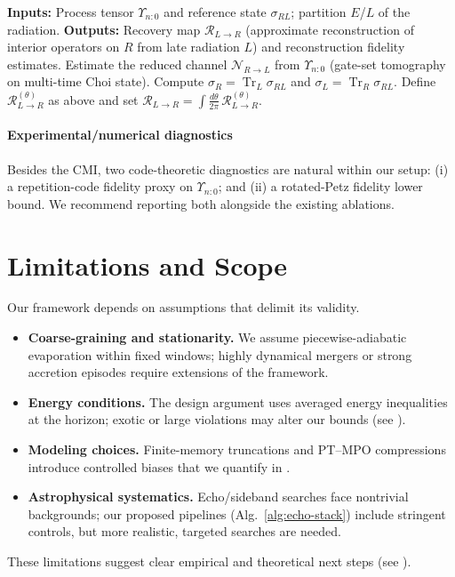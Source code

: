 \documentclass[a4paper,11pt]{article}
\newcommand{\HMC}{\textup{\textsc{HMC}}\xspace}
\newcommand{\Tr}{\operatorname{Tr}}
\theoremstyle{plain}
\theoremstyle{definition}
\theoremstyle{remark}
\begin{document}
\begin{algorithm}[tbp]
\caption{QEC reconstruction for \HMC{} via rotated Petz.}
\label{alg:rotated_petz_hmc}
\begin{algorithmic}[1]
\State \textbf{Inputs:} Process tensor $\Upsilon_{n{:}0}$ and reference state $\sigma_{RL}$; partition $E$/$L$ of the radiation.
\State \textbf{Outputs:} Recovery map $\mathcal{R}_{L\to R}$ (approximate reconstruction of interior operators on $R$ from late radiation $L$) and reconstruction fidelity estimates.
\State Estimate the reduced channel $\mathcal{N}_{R\to L}$ from $\Upsilon_{n{:}0}$ (gate-set tomography on multi-time Choi state).
\State Compute $\sigma_R=\Tr_L\sigma_{RL}$ and $\sigma_L=\Tr_R\sigma_{RL}$.
\State Define $\mathcal{R}^{(\theta)}_{L\to R}$ as above and set $\mathcal{R}_{L\to R} = \int \frac{d\theta}{2\pi}\,\mathcal{R}^{(\theta)}_{L\to R}$.
\end{algorithmic}
\end{algorithm}

\paragraph{Experimental/numerical diagnostics}
Besides the CMI, two code-theoretic diagnostics are natural within our setup: (i) a repetition-code fidelity proxy on $\Upsilon_{n{:}0}$; and (ii) a rotated-Petz fidelity lower bound. We recommend reporting both alongside the existing ablations.


\section{Limitations and Scope}
\label{sec:limitations}
Our framework depends on assumptions that delimit its validity.
\begin{itemize}[leftmargin=*]
  \item \textbf{Coarse-graining and stationarity.} We assume piecewise-adiabatic evaporation within fixed windows; highly dynamical mergers or strong accretion episodes require extensions of the framework.
  \item \textbf{Energy conditions.} The design argument uses averaged energy inequalities at the horizon; exotic or large violations may alter our bounds (see ).
  \item \textbf{Modeling choices.} Finite-memory truncations and PT--MPO compressions introduce controlled biases that we quantify in .
  \item \textbf{Astrophysical systematics.} Echo/sideband searches face nontrivial backgrounds; our proposed pipelines (Alg.~\ref{alg:echo-stack}) include stringent controls, but more realistic, targeted searches are needed.
\end{itemize}
These limitations suggest clear empirical and theoretical next steps (see ).
\end{document}
